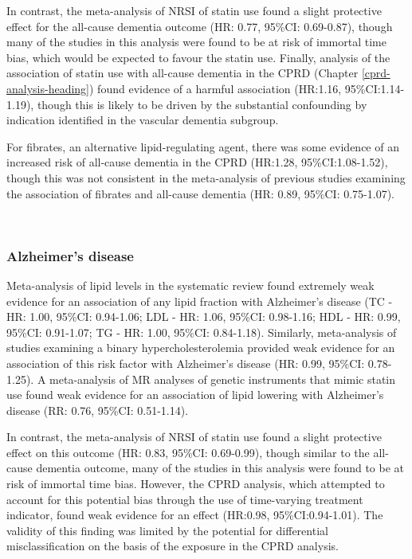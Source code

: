 \documentclass[a4paper, twoside]{templates/ociamthesis}
\begin{document}
In contrast, the meta-analysis of NRSI of statin use found a slight protective effect for the all-cause dementia outcome (HR: 0.77, 95\%CI: 0.69-0.87), though many of the studies in this analysis were found to be at risk of immortal time bias, which would be expected to favour the statin use. Finally, analysis of the association of statin use with all-cause dementia in the CPRD (Chapter \ref{cprd-analysis-heading}) found evidence of a harmful association (HR:1.16, 95\%CI:1.14-1.19), though this is likely to be driven by the substantial confounding by indication identified in the vascular dementia subgroup.

For fibrates, an alternative lipid-regulating agent, there was some evidence of an increased risk of all-cause dementia in the CPRD (HR:1.28, 95\%CI:1.08-1.52), though this was not consistent in the meta-analysis of previous studies examining the association of fibrates and all-cause dementia (HR: 0.89, 95\%CI: 0.75-1.07).

~

\hypertarget{alzheimers-disease-1}{%
\subsubsection{Alzheimer's disease}\label{alzheimers-disease-1}}

Meta-analysis of lipid levels in the systematic review found extremely weak evidence for an association of any lipid fraction with Alzheimer's disease (TC - HR: 1.00, 95\%CI: 0.94-1.06; LDL - HR: 1.06, 95\%CI: 0.98-1.16; HDL - HR: 0.99, 95\%CI: 0.91-1.07; TG - HR: 1.00, 95\%CI: 0.84-1.18). Similarly, meta-analysis of studies examining a binary hypercholesterolemia provided weak evidence for an association of this risk factor with Alzheimer's disease (HR: 0.99, 95\%CI: 0.78-1.25). A meta-analysis of MR analyses of genetic instruments that mimic statin use found weak evidence for an association of lipid lowering with Alzheimer's disease (RR: 0.76, 95\%CI: 0.51-1.14).

In contrast, the meta-analysis of NRSI of statin use found a slight protective effect on this outcome (HR: 0.83, 95\%CI: 0.69-0.99), though similar to the all-cause dementia outcome, many of the studies in this analysis were found to be at risk of immortal time bias. However, the CPRD analysis, which attempted to account for this potential bias through the use of time-varying treatment indicator, found weak evidence for an effect (HR:0.98, 95\%CI:0.94-1.01). The validity of this finding was limited by the potential for differential misclassification on the basis of the exposure in the CPRD analysis.
\end{document}
